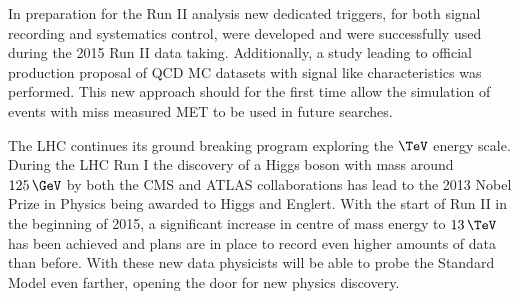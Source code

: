 In preparation for the Run II analysis new dedicated triggers, for both signal recording and systematics control, were developed and were successfully used during the 2015 Run II data taking. Additionally, a study leading to official production proposal of \gls{QCD} \gls{MC} datasets with signal like characteristics was performed. This new approach should for the first time allow the simulation of events with miss measured \gls{MET} to be used in future searches.

The \gls{LHC} continues its ground breaking program exploring the $\TeV$ energy scale. During the \gls{LHC} Run I the discovery of a Higgs boson with mass around $125\,\GeV$ by both the CMS and ATLAS collaborations has lead to the 2013 Nobel Prize in Physics being awarded to Higgs and Englert. With the start of Run II in the beginning of 2015, a significant increase in centre of mass energy to $13\,\TeV$ has been achieved and plans are in place to record even higher amounts of data than before. With these new data physicists will be able to probe the Standard Model even farther, opening the door for new physics discovery.
